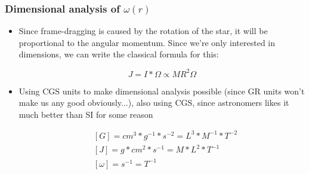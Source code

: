 \begin{frame}
\frametitle{Dimensional analysis of $\omega (r)$}

\begin{itemize}
	\item Since frame-dragging is caused by the rotation of the star, it will be proportional to the angular momentum. Since we're only interested in dimensions, we can write the classical formula for this:
	\begin{block}{}
		\begin{equation} \label{eq:3}
			J = I * \Omega \propto M R^{2} \Omega
		\end{equation}
	\end{block}
	\item Using CGS units to make dimensional analysis possible (since GR units won't make us any good obviously...), also using CGS, since astronomers likes it much better than SI for some reason
	\begin{block}{}
		\begin{align*}
			&\left[ G \right] = cm^{3} * g^{-1} * s^{-2} = L^{3} * M^{-1} * T^{-2} \\
			&\left[ J \right] = g * cm^{2} * s^{-1} = M * L^{2} * T^{-1} \\
			&\left[ \omega \right] = s^{-1} = T^{-1}
		\end{align*}
	\end{block}
\end{itemize}

\end{frame}